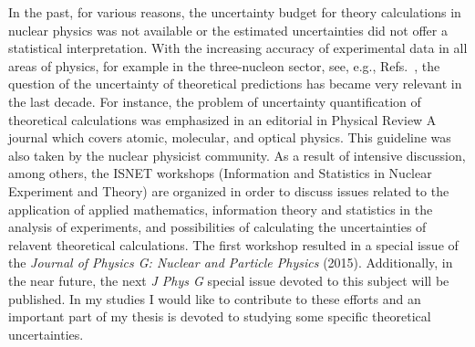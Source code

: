 In the past, for various reasons, the uncertainty budget for theory calculations in nuclear physics was not available or the estimated uncertainties did not offer a statistical interpretation.
With the increasing accuracy of experimental data in all areas of physics, for example in the three-nucleon sector, see, e.g., Refs.~\cite{Howell1994, Kistryn2005, Przewoski2006, Weisel2014, Sekiguchi2017}, 
the question of the uncertainty of theoretical predictions has became very relevant in the last decade.
For instance, the problem of uncertainty quantification of theoretical calculations was emphasized in an editorial in Physical Review A~\cite{edit2011} journal which covers atomic, molecular, and optical physics. 
This guideline was also taken by the nuclear physicist community.  
As a result of intensive discussion, among others, the ISNET workshops (Information and Statistics in Nuclear Experiment and 
Theory) are organized in order to discuss issues related to the application of applied 
mathematics, information theory and statistics in the analysis of experiments,
and possibilities of calculating the uncertainties of relavent theoretical 
calculations. The 
first workshop resulted in a special issue of the \textit{Journal of Physics G: 
Nuclear and Particle Physics} (2015). Additionally, in the near future, the next \textit{J Phys G} 
special issue devoted to this subject will be published. In my studies I would like to contribute to these efforts and an important part of my thesis is devoted to studying some specific theoretical uncertainties.


